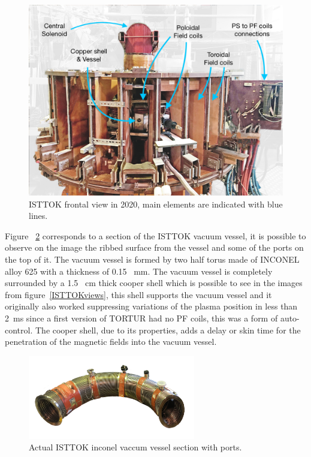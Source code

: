 \begin{figure}[htbp]
	\centering
	\includegraphics[width=1.1\textwidth]{Chp4/FrontISTTOK.png}
	\caption{\label{ISTTOK_front}ISTTOK frontal view in 2020, main elements are indicated with blue lines.   }
\end{figure}

Figure ~\ref{VV_IST} corresponds to a section of the ISTTOK vacuum vessel, it is possible to observe on the image the ribbed  surface from the vessel and some of the ports on the top of it. The vacuum vessel is formed by two half torus made of INCONEL alloy 625 with a thickness of 0.15~ mm. The vacuum vessel is completely surrounded by a 1.5 ~cm thick cooper shell which is possible to see in the images from figure~\ref{ISTTOKviews}, this shell supports the vacuum vessel and it originally  also worked suppressing  variations of the plasma position in less than 2~ms since a first version of TORTUR had no PF coils, this was a form of auto-control. The  cooper shell, due to its properties, adds a delay or skin time for the  penetration of the magnetic fields into the vacuum vessel.
\smallskip

\begin{figure}[htbp]
	\centering
	\includegraphics[width=0.65\textwidth]{Chp4/VacuumVessel_Low.png}
	\caption{\label{VV_IST} Actual ISTTOK inconel  vaccum vessel section with ports.  }
\end{figure}






